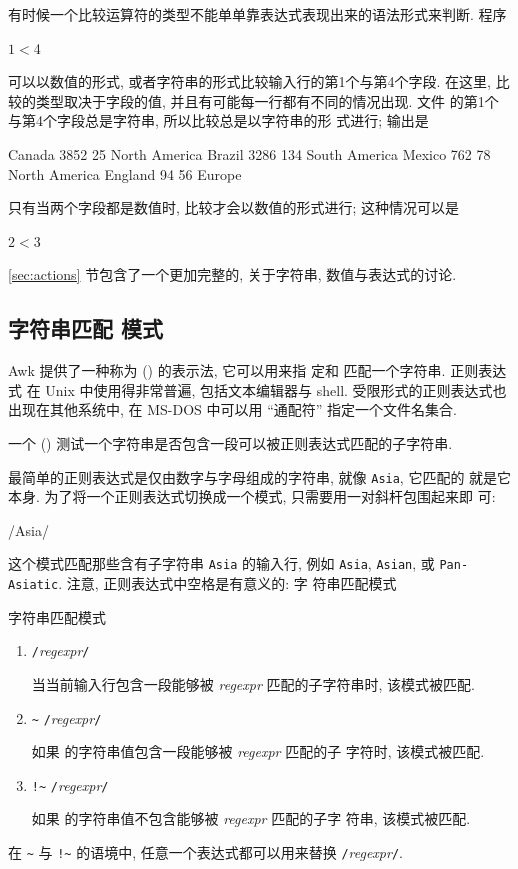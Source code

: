 有时候一个比较运算符的类型不能单单靠表达式表现出来的语法形式来判断. 程序
\begin{awkcode}
    $1 < $4
\end{awkcode}
可以以数值的形式, 或者字符串的形式比较输入行的第1个与第4个字段. 在这里,
比较的类型取决于字段的值, 并且有可能每一行都有不同的情况出现. 文件
 的第1个与第4个字段总是字符串, 所以比较总是以字符串的形
式进行; 输出是
\begin{file}
    Canada      3852    25      North America
    Brazil      3286    134     South America
    Mexico      762     78      North America
    England     94      56      Europe
\end{file}
只有当两个字段都是数值时, 比较才会以数值的形式进行; 这种情况可以是
\begin{awkcode}
    $2 < $3
\end{awkcode}

\ref{sec:actions} 节包含了一个更加完整的, 关于字符串, 数值与表达式的讨论.

\subsection{字符串匹配 模式}
\label{subsec:string_matching_pattern}

Awk 提供了一种称为  (\regexpr) 的表示法, 它可以用来指
定和
匹配一个字符串.  正则表达式 在 Unix 中使用得非常普遍, 包括文本编辑器与
shell. 受限形式的正则表达式也出现在其他系统中, 在 MS-DOS 中可以用
``通配符'' 指定一个文件名集合.

一个  ()
测试一个字符串是否包含一段可以被正则表达式匹配的子字符串.

最简单的正则表达式是仅由数字与字母组成的字符串, 就像 \verb'Asia', 它匹配的
就是它本身. 为了将一个正则表达式切换成一个模式, 只需要用一对斜杆包围起来即
可:
\begin{awkcode}
    /Asia/
\end{awkcode}
这个模式匹配那些含有子字符串 \verb'Asia' 的输入行, 例如 \verb'Asia',
\verb'Asian', 或 \verb'Pan-Asiatic'. 注意, 正则表达式中空格是有意义的: 字
符串匹配模式
\begin{summary}{字符串匹配模式}
    \begin{enumerate}
        \item \verb'/'\textit{regexpr}\verb'/' \par
            当当前输入行包含一段能够被 \textit{regexpr} 匹配的子字符串时,
            该模式被匹配.
        \item \expr {} \verb'~' \verb'/'\textit{regexpr}\verb'/' \par
            如果 \expr 的字符串值包含一段能够被 \textit{regexpr} 匹配的子
            字符时, 该模式被匹配.
        \item \expr {} \verb'!~' \verb'/'\textit{regexpr}\verb'/' \par
            如果 \expr 的字符串值不包含能够被 \textit{regexpr} 匹配的子字
            符串, 该模式被匹配.
    \end{enumerate}
    在 \verb'~' 与 \verb'!~' 的语境中, 任意一个表达式都可以用来替换
    \verb'/'\textit{regexpr}\verb'/'.
\end{summary}

